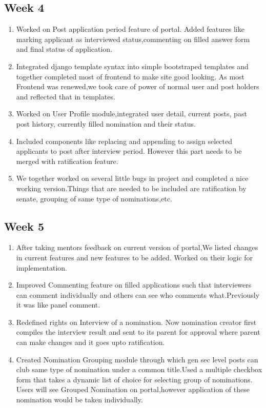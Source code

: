 \documentclass[12pt,a4paper]{scrartcl}
\begin{document}
\subsection{Week 4}
\begin{enumerate}
	\item Worked on Post application period feature of portal. Added features like marking applicant as interviewed status,commenting on filled answer form and final status of application.
	\item Integrated django template syntax into simple bootstraped templates and  together completed most of frontend to make site good looking. As most Frontend was renewed,we took care of power of normal user and post holders and reflected that in templates.
	\item Worked on User Profile module,integrated user detail, current posts, past post history, currently filled nomination and their status.
	\item Included components like replacing and appending to assign selected applicants to post after interview period. However this part needs to be merged with ratification feature.
	\item We together worked on several little bugs in project and completed a nice working version.Things that are needed to be included are ratification by senate, grouping of same type of nominations,etc.

\end{enumerate}

\subsection{Week 5}
\begin{enumerate}
    \item After taking mentors feedback on current version of portal,We listed changes in current features and new features to be added. Worked on their logic for implementation.
    \item Improved Commenting feature on filled applications such that interviewers can comment individually and others can see who comments what.Previously it was like panel comment.
    \item Redefined rights on Interview of a nomination. Now nomination creator first compiles the interview result and sent to its parent for approval where parent can make changes and it goes upto ratification.

   \item Created Nomination Grouping module through which gen sec level posts can club same type of nomination under a common title.Used a multiple checkbox form that takes a dynamic list of choice for selecting group of nominations. Users will see Grouped Nomination on portal,however application of these nomination would be taken individually.
\end{enumerate}
\end{document}
